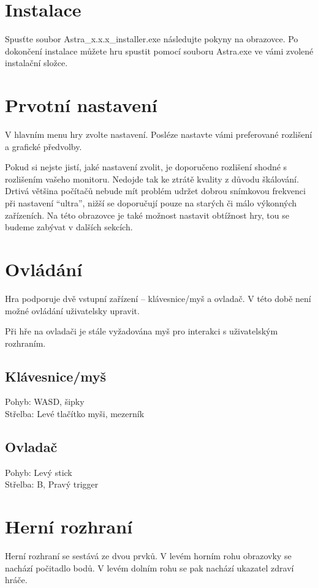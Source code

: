 \documentclass[12pt,a4paper,hidelinks]{article}
\begin{document}
\section{Instalace}
Spusťte soubor Astra{\_}x.x.x{\_}installer.exe následujte pokyny na obrazovce. Po dokončení instalace můžete hru spustit pomocí souboru Astra.exe ve vámi zvolené instalační složce.

\section{Prvotní nastavení}
V hlavním menu hry zvolte nastavení. Posléze nastavte vámi preferované rozlišení a grafické předvolby.

Pokud si nejste jistí, jaké nastavení zvolit, je doporučeno rozlišení shodné s rozlišením vašeho monitoru. Nedojde tak ke ztrátě kvality z důvodu škálování. Drtivá většina počítačů nebude mít problém udržet dobrou snímkovou frekvenci při nastavení \enquote{ultra}, nižší se doporučují pouze na starých či málo výkonných zařízeních.
Na této obrazovce je také možnost nastavit obtížnost hry, tou se budeme zabývat v dalších sekcích.
\section{Ovládání}
Hra podporuje dvě vstupní zařízení – klávesnice/myš a ovladač. V této době není možné ovládání uživatelsky upravit.

Při hře na ovladači je stále vyžadována myš pro interakci s uživatelským rozhraním.
\subsection{Klávesnice/myš}
Pohyb: WASD, šipky\\
Střelba: Levé tlačítko myši, mezerník

\subsection{Ovladač}
Pohyb: Levý stick\\
Střelba: B, Pravý trigger

\section{Herní rozhraní}
Herní rozhraní se sestává ze dvou prvků. V levém horním rohu obrazovky se nachází počitadlo bodů. V levém dolním rohu se pak nachází ukazatel zdraví hráče.
\end{document}

